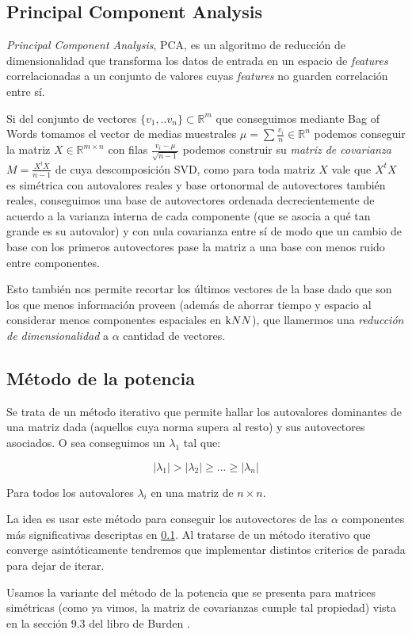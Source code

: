 
\subsection{Principal Component Analysis}%
\label{sub:principal_component_analysis}

\textit{Principal Component Analysis}, PCA, es un algoritmo de reducción de
dimensionalidad que transforma los datos de entrada en un espacio de
\textit{features} correlacionadas a un conjunto de valores cuyas
\textit{features} no guarden correlación entre sí.


Si del conjunto de vectores $\{v_1,..v_n \} \subset \mathds{R}^m$ que
conseguimos mediante Bag of Words tomamos el vector de medias muestrales
$\mu = \sum \frac{v_i}{n} \in \mathds{R}^n $ podemos conseguir la matriz
$X \in \mathds{R}^{m\times n}$
con filas $\frac{v_i-\mu}{\sqrt{n-1}}$
podemos construir su \textit{matriz de covarianza} $M=\frac{X^t X}{n-1}$
de cuya
descomposición SVD, como para toda matriz $X$ vale que $X^t X$ es simétrica
con autovalores reales y base ortonormal de autovectores también reales,
conseguimos una base de autovectores ordenada decrecientemente de acuerdo
a la varianza interna de cada componente (que se asocia a qué tan grande es su autovalor) y con nula covarianza entre
sí de modo que un cambio de base con los primeros autovectores pase la matriz a una base con menos ruido entre componentes.

Esto también nos permite recortar los últimos vectores de la base dado que son los que menos información proveen (además de ahorrar tiempo y espacio al considerar menos componentes espaciales en $\knn{}$), que llamermos una \textit{reducción de dimensionalidad} a $\alpha$ cantidad de vectores.

\subsection{Método de la potencia}%
\label{sub:pm}
Se trata de un método iterativo que permite hallar los autovalores dominantes de
una matriz dada (aquellos cuya norma supera al resto) y sus autovectores
asociados. O sea conseguimos un $\lambda_1$ tal que:

$$ |\lambda_1| > |\lambda_2| \geq ... \geq |\lambda_n| $$

Para todos los autovalores $\lambda_i$ en una matriz de $n\times n$.

La idea es usar este método para conseguir los autovectores de las $\alpha$
componentes más significativas descriptas en \ref{sub:principal_component_analysis}. Al tratarse
de un método iterativo que converge asintóticamente tendremos que implementar distintos criterios de parada para dejar de iterar.

Usamos la variante del método de la potencia que se presenta para matrices simétricas (como ya vimos, la matriz de covarianzas cumple tal propiedad) vista en la sección 9.3 del libro de Burden \cite{Burden}.
